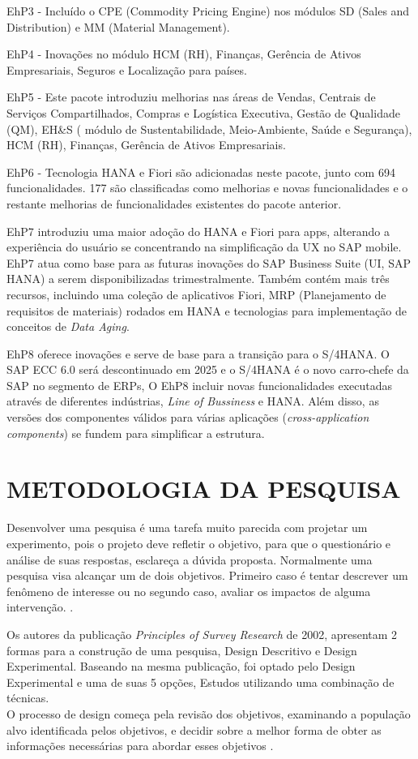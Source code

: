 EhP3 - Incluído o CPE (Commodity Pricing Engine) nos módulos SD (Sales and Distribution) e MM (Material Management).

EhP4 - Inovações no módulo HCM (RH), Finanças, Gerência de Ativos Empresariais, Seguros e Localização para países.

EhP5 - Este pacote introduziu melhorias nas áreas de Vendas, Centrais de Serviços Compartilhados, Compras e Logística Executiva, Gestão de Qualidade (QM), EH\&S ( módulo de Sustentabilidade, Meio-Ambiente, Saúde e Segurança), HCM (RH), Finanças, Gerência de Ativos Empresariais.

EhP6 - Tecnologia HANA e Fiori são adicionadas neste pacote,  junto com 694 funcionalidades. 177 são classificadas como melhorias e novas funcionalidades e o restante melhorias de funcionalidades existentes do pacote anterior.

EhP7 introduziu uma maior adoção do HANA e Fiori para apps, alterando a experiência do usuário se concentrando na simplificação da UX no SAP mobile. EhP7 atua como base para as futuras inovações do SAP Business Suite (UI, SAP HANA) a serem disponibilizadas trimestralmente. Também contém mais três recursos, incluindo uma coleção de aplicativos Fiori, MRP (Planejamento de requisitos de materiais) rodados em HANA e tecnologias para implementação de conceitos de \textit{Data Aging}.

EhP8 oferece inovações e serve de base para a transição para o S/4HANA. O SAP ECC 6.0 será descontinuado em 2025 e o S/4HANA é o novo carro-chefe da SAP no segmento de ERPs, O EhP8 incluir novas funcionalidades executadas através de diferentes indústrias, \textit{Line of Bussiness} e HANA. Além disso, as versões dos componentes válidos para várias aplicações (\textit{cross-application components})  se fundem para simplificar a estrutura.

\section{\esp METODOLOGIA DA PESQUISA}

Desenvolver uma pesquisa é uma tarefa muito parecida com projetar um experimento, pois o projeto deve refletir o objetivo, para que o questionário e análise de suas respostas, esclareça a dúvida proposta. Normalmente uma pesquisa visa alcançar um de dois objetivos. Primeiro caso é tentar descrever um fenômeno de interesse ou no segundo caso, avaliar os impactos de alguma intervenção. \cite{Kitchenham}.

Os autores da publicação \textit{Principles of Survey Research} de 2002, apresentam 2 formas para a construção de uma pesquisa, Design Descritivo e Design Experimental. Baseando na mesma publicação, foi optado pelo Design Experimental e uma de suas 5 opções, Estudos utilizando uma combinação de técnicas.
\\
O processo de design começa pela revisão dos objetivos, examinando a população alvo identificada pelos objetivos, e decidir sobre a melhor forma de obter as informações necessárias para abordar esses objetivos \cite{Kitchenham}.


